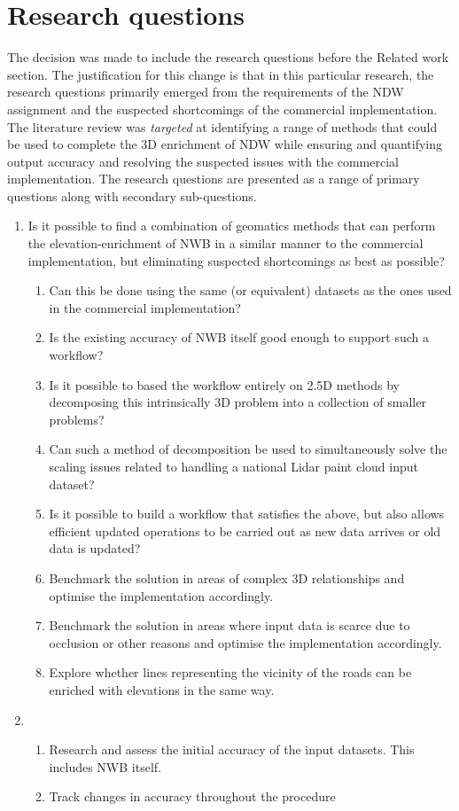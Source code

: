 
\chapter{Research questions}
\label{chap:rq}

The decision was made to include the research questions before the Related work section. The justification for this change is that in this particular research, the research questions primarily emerged from the requirements of the NDW assignment and the suspected shortcomings of the commercial implementation. The literature review was \textit{targeted} at identifying a range of methods that could be used to complete the 3D enrichment of NDW while ensuring and quantifying output accuracy and resolving the suspected issues with the commercial implementation. The research questions are presented as a range of primary questions along with secondary sub-questions.


\begin{enumerate}
\item Is it possible to find a combination of geomatics methods that can perform the elevation-enrichment of NWB in a similar manner to the commercial implementation, but eliminating suspected shortcomings as best as possible?
\begin{enumerate}
    \item Can this be done using the same (or equivalent) datasets as the ones used in the commercial implementation?
    \item Is the existing accuracy of NWB itself good enough to support such a workflow?
    \item Is it possible to based the workflow entirely on 2.5D methods by decomposing this intrinsically 3D problem into a collection of smaller problems?
    \item Can such a method of decomposition be used to simultaneously solve the scaling issues related to handling a national Lidar paint cloud input dataset?
    \item Is it possible to build a workflow that satisfies the above, but also allows efficient updated operations to be carried out as new data arrives or old data is updated?
    \item Benchmark the solution in areas of complex 3D relationships and optimise the implementation accordingly.
    \item Benchmark the solution in areas where input data is scarce due to occlusion or other reasons and optimise the implementation accordingly.
    \item Explore whether lines representing the vicinity of the roads can be enriched with elevations in the same way.
\end{enumerate}
\item 
\begin{enumerate}
\item Research and assess the initial accuracy of the input datasets. This includes NWB itself.
\item Track changes in accuracy throughout the procedure
\end{enumerate}
\end{enumerate}